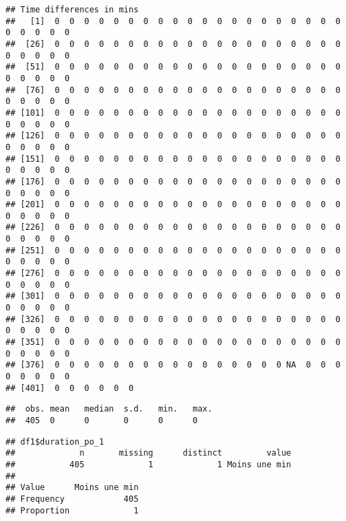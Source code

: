\documentclass[
]{article}
\begin{document}
\begin{verbatim}
## Time differences in mins
##   [1]  0  0  0  0  0  0  0  0  0  0  0  0  0  0  0  0  0  0  0  0  0  0  0  0  0
##  [26]  0  0  0  0  0  0  0  0  0  0  0  0  0  0  0  0  0  0  0  0  0  0  0  0  0
##  [51]  0  0  0  0  0  0  0  0  0  0  0  0  0  0  0  0  0  0  0  0  0  0  0  0  0
##  [76]  0  0  0  0  0  0  0  0  0  0  0  0  0  0  0  0  0  0  0  0  0  0  0  0  0
## [101]  0  0  0  0  0  0  0  0  0  0  0  0  0  0  0  0  0  0  0  0  0  0  0  0  0
## [126]  0  0  0  0  0  0  0  0  0  0  0  0  0  0  0  0  0  0  0  0  0  0  0  0  0
## [151]  0  0  0  0  0  0  0  0  0  0  0  0  0  0  0  0  0  0  0  0  0  0  0  0  0
## [176]  0  0  0  0  0  0  0  0  0  0  0  0  0  0  0  0  0  0  0  0  0  0  0  0  0
## [201]  0  0  0  0  0  0  0  0  0  0  0  0  0  0  0  0  0  0  0  0  0  0  0  0  0
## [226]  0  0  0  0  0  0  0  0  0  0  0  0  0  0  0  0  0  0  0  0  0  0  0  0  0
## [251]  0  0  0  0  0  0  0  0  0  0  0  0  0  0  0  0  0  0  0  0  0  0  0  0  0
## [276]  0  0  0  0  0  0  0  0  0  0  0  0  0  0  0  0  0  0  0  0  0  0  0  0  0
## [301]  0  0  0  0  0  0  0  0  0  0  0  0  0  0  0  0  0  0  0  0  0  0  0  0  0
## [326]  0  0  0  0  0  0  0  0  0  0  0  0  0  0  0  0  0  0  0  0  0  0  0  0  0
## [351]  0  0  0  0  0  0  0  0  0  0  0  0  0  0  0  0  0  0  0  0  0  0  0  0  0
## [376]  0  0  0  0  0  0  0  0  0  0  0  0  0  0  0  0 NA  0  0  0  0  0  0  0  0
## [401]  0  0  0  0  0  0
\end{verbatim}

\begin{verbatim}
##  obs. mean   median  s.d.   min.   max.  
##  405  0      0       0      0      0
\end{verbatim}

\begin{verbatim}
## df1$duration_po_1 
##             n       missing      distinct         value 
##           405             1             1 Moins une min 
##                         
## Value      Moins une min
## Frequency            405
## Proportion             1
\end{verbatim}
\end{document}

